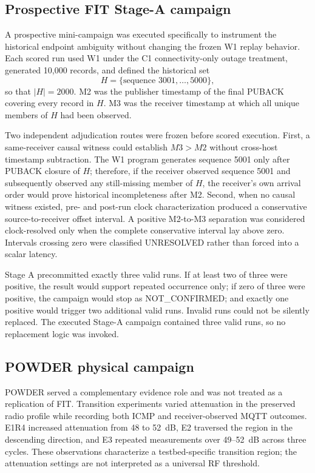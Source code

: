 \documentclass[journal]{IEEEtran}
\begin{document}
\subsection{Prospective FIT Stage-A campaign}

A prospective mini-campaign was executed specifically to instrument the historical endpoint ambiguity without changing the frozen W1 replay behavior. Each scored run used W1 under the C1 connectivity-only outage treatment, generated 10,000 records, and defined the historical set
\[
H=\{\text{sequence }3001,\ldots,5000\},
\]
so that $|H|=2000$. M2 was the publisher timestamp of the final PUBACK covering every record in $H$. M3 was the receiver timestamp at which all unique members of $H$ had been observed.

Two independent adjudication routes were frozen before scored execution. First, a same-receiver causal witness could establish $M3>M2$ without cross-host timestamp subtraction. The W1 program generates sequence 5001 only after PUBACK closure of $H$; therefore, if the receiver observed sequence 5001 and subsequently observed any still-missing member of $H$, the receiver's own arrival order would prove historical incompleteness after M2. Second, when no causal witness existed, pre- and post-run clock characterization produced a conservative source-to-receiver offset interval. A positive M2-to-M3 separation was considered clock-resolved only when the complete conservative interval lay above zero. Intervals crossing zero were classified UNRESOLVED rather than forced into a scalar latency.

Stage A precommitted exactly three valid runs. If at least two of three were positive, the result would support repeated occurrence only; if zero of three were positive, the campaign would stop as NOT\_CONFIRMED; and exactly one positive would trigger two additional valid runs. Invalid runs could not be silently replaced. The executed Stage-A campaign contained three valid runs, so no replacement logic was invoked.

\subsection{POWDER physical campaign}

POWDER \cite{powder} served a complementary evidence role and was not treated as a replication of FIT. Transition experiments varied attenuation in the preserved radio profile while recording both ICMP and receiver-observed MQTT outcomes. E1R4 increased attenuation from 48 to 52~dB, E2 traversed the region in the descending direction, and E3 repeated measurements over 49--52~dB across three cycles. These observations characterize a testbed-specific transition region; the attenuation settings are not interpreted as a universal RF threshold.
\end{document}

